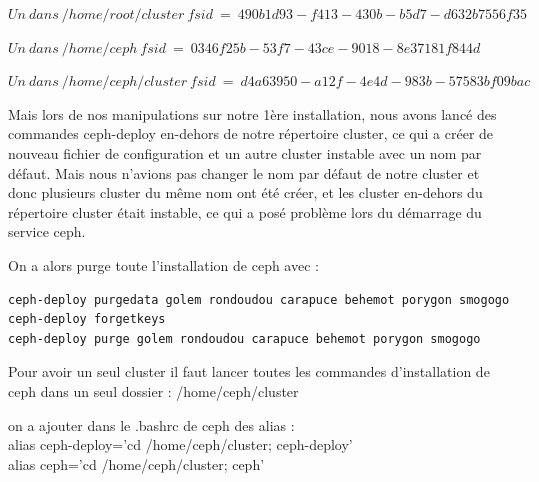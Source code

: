 \documentclass[12pt]{article}
\begin{document}
 $ Un\ dans\ /home/root/cluster\ fsid\ =\ 490b1d93-f413-430b-b5d7-d632b7556f35$
	 
 $ Un\ dans\ /home/ceph\ fsid\ =\ 0346f25b-53f7-43ce-9018-8e37181f844d$
 
	 $ Un\ dans\ /home/ceph/cluster\ fsid\ =\ d4a63950-a12f-4e4d-983b-57583bf09bac$
	 
	 Mais lors de nos manipulations sur notre 1ère installation, nous avons lancé des commandes ceph-deploy en-dehors de notre répertoire cluster, ce qui a créer de nouveau fichier de configuration et un autre cluster instable avec un nom par défaut. Mais nous n'avions pas changer le nom par défaut de notre cluster et donc plusieurs cluster du même nom ont été créer, et les cluster en-dehors du répertoire cluster était instable, ce qui a posé problème lors du démarrage du service ceph.	

On a alors purge toute l'installation de ceph avec :
\begin{verbatim}
ceph-deploy purgedata golem rondoudou carapuce behemot porygon smogogo
ceph-deploy forgetkeys
ceph-deploy purge golem rondoudou carapuce behemot porygon smogogo
\end{verbatim}

Pour avoir un seul cluster il faut lancer toutes les commandes d'installation de ceph dans un seul dossier : /home/ceph/cluster

on a ajouter dans le .bashrc de ceph des alias :
\\ alias ceph-deploy='cd /home/ceph/cluster; ceph-deploy' 
\\ alias ceph='cd /home/ceph/cluster; ceph' 
\end{document}

